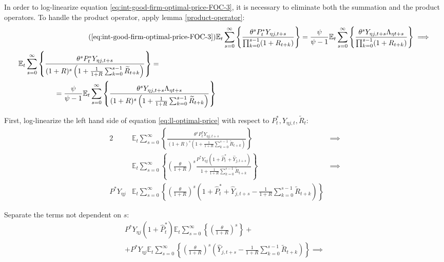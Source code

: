 \documentclass[
	12pt,
	]{article}
\numberwithin{equation}{section}
\newcommand{\E}[1][t]{{\mathbb{E}_{#1}}}
\theoremstyle{definition}
\theoremstyle{plain}
\theoremstyle{plain}
\theoremstyle{plain}
\begin{document}
In order to log-linearize equation \ref{eq:int-good-firm-optimal-price-FOC-3}, it is necessary to eliminate both the summation and the product operators. To handle the product operator, apply lemma \ref{product-operator}:
\begin{align}
	\tag{\ref{eq:int-good-firm-optimal-price-FOC-3}}
	& \E \sum_{s=0}^{\infty} \left\{ \frac{\theta^s P_t^\ast Y_{\eta j,t+s} }{ \prod_{k=0}^{s-1}(1+R_{t+k})} \right\} = \frac{\psi}{\psi-1} \E \sum_{s=0}^{\infty} \left\{ \frac{\theta^s Y_{\eta j,t+s} \Lambda_{\eta t+s}}{\prod_{k=0}^{s-1}(1+R_{t+k})} \right\} \implies
	\\
	\begin{split}
		& \E \sum_{s=0}^{\infty} \left\{ \frac{\theta^s P_t^\ast Y_{\eta j,t+s}}{ (1 + R)^s \left( 1 + \frac{1}{1 + R} \sum_{k=0}^{s-1} \widetilde{R}_{t+k} \right) } \right\} = 
		\\ & \quad \quad \quad \quad \quad = \frac{\psi}{\psi-1} \E \sum_{s=0}^{\infty} \left\{ \frac{\theta^s Y_{\eta j,t+s} \Lambda_{\eta t+s}}{ (1 + R)^s \left( 1 + \frac{1}{1 + R} \sum_{k=0}^{s-1} \widetilde{R}_{t+k} \right) } \right\} \label{eq:ll-optimal-price}
	\end{split}
\end{align}

First, log-linearize the left hand side of equation \ref{eq:ll-optimal-price} with respect to \( P_t^\ast, Y_{\eta j,t}, \widetilde{R}_t \):
\begin{alignat}{2}
	& \E \sum_{s=0}^{\infty} \left\{ \frac{\theta^s P_t^\ast Y_{\eta j,t+s}}{ (1 + R)^s \left( 1 + \frac{1}{1 + R} \sum_{k=0}^{s-1} \widetilde{R}_{t+k} \right) } \right\} &\implies \nonumber \\
	& \E \sum_{s=0}^{\infty} \left\{ \left( \frac{\theta}{1 + R} \right)^s  \frac{ P^\ast Y_{\eta j} \left( 1 + \hat{P}_t^\ast + \hat{Y}_{j,t+s} \right) }{ 1 + \frac{1}{1 + R} \sum_{k=0}^{s-1} \widetilde{R}_{t+k} } \right\} &\implies \nonumber \\
	P^\ast Y_{\eta j} &\E \sum_{s=0}^{\infty} \left\{ \left( \frac{\theta}{1 + R} \right)^s \left( 1 + \hat{P}_t^\ast + \hat{Y}_{j,t+s} - \frac{1}{1 + R} \sum_{k=0}^{s-1} \widetilde{R}_{t+k} \right) \right\} & \nonumber
\end{alignat}

Separate the terms not dependent on $s$:
\begin{multline}
	P^\ast Y_{\eta j} ( 1 + \hat{P}_t^\ast ) \E \sum_{s=0}^{\infty} \left\{ \left( \frac{\theta}{1 + R} \right)^s \right\} + \\
	+ P^\ast Y_{\eta j} \E \sum_{s=0}^{\infty} \left\{ \left( \frac{\theta}{1 + R} \right)^s \left( \hat{Y}_{j,t+s} - \frac{1}{1 + R} \sum_{k=0}^{s-1} \widetilde{R}_{t+k} \right) \right\} \implies \nonumber
\end{multline}
\end{document}
